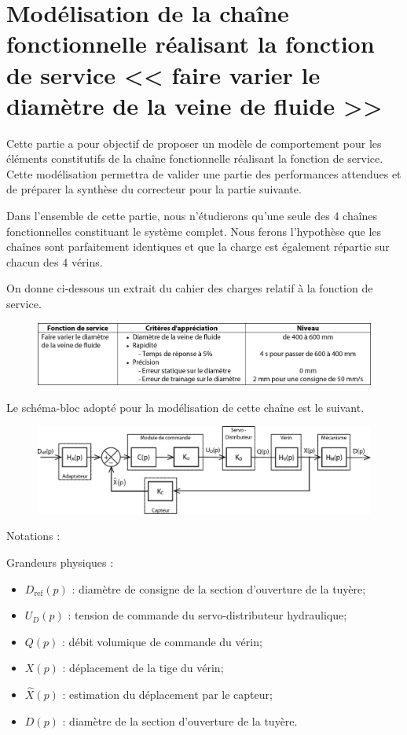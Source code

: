 \documentclass[10pt,fleqn]{article} %
\begin{document}
\section{Modélisation de la chaîne fonctionnelle réalisant la fonction de service << faire varier le diamètre de la veine de fluide >> \label{sec_B}}

\begin{obj}
Cette partie a pour objectif de proposer un modèle de comportement pour les éléments constitutifs de la chaîne fonctionnelle réalisant la fonction de service. Cette modélisation permettra de valider une partie des performances attendues et de préparer la synthèse du correcteur pour la partie suivante.
\end{obj}

	Dans l'ensemble de cette partie, nous n'étudierons qu'une seule des 4 chaînes fonctionnelles constituant le système complet. Nous ferons l'hypothèse que les chaînes sont parfaitement identiques et que la charge est également répartie sur chacun des 4 vérins.
	
	On donne ci-dessous un extrait du cahier des charges relatif à la fonction de service.

\begin{figure}[H]
\centering
\includegraphics[width=\linewidth]{img_05}
\end{figure}

	 Le schéma-bloc adopté pour la modélisation de cette chaîne est le suivant.
\begin{figure}[H]
\centering
\includegraphics[width=\linewidth]{img_06}
\end{figure}	 


\noindent Notations :

\noindent Grandeurs physiques :
\begin{itemize}
\item $D_{\text{ref}}(p)$ : 	diamètre de consigne de la section d'ouverture de la tuyère;
\item $U_D(p)$	 	:	tension de commande du servo-distributeur hydraulique;
\item $Q(p)$	  	:	débit volumique de commande du vérin;
\item $X(p)$	 	:	déplacement de la tige du vérin;
\item $\hat{X}(p)$ 	:	estimation du déplacement par le capteur;
\item $D(p)$		:	diamètre de la section d'ouverture de la tuyère.
\end{itemize}
\end{document}
